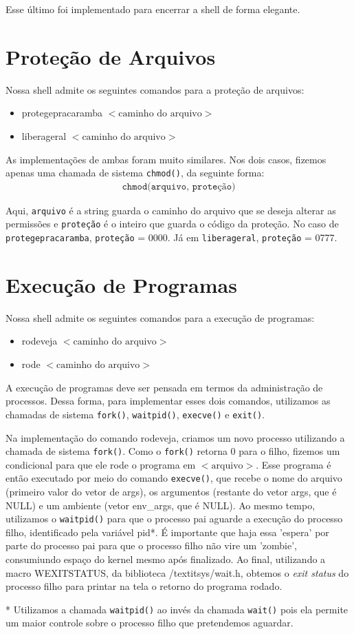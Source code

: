 \documentclass[a4paper, 12pt]{article}
\begin{document}
Esse último foi implementado para encerrar a shell de forma elegante.

\section{Proteção de Arquivos}

Nossa shell admite os seguintes comandos para a proteção de arquivos:
\begin{itemize}
\item protegepracaramba $<\textrm{caminho do arquivo}>$
\item liberageral $<\textrm{caminho do arquivo}>$
\end{itemize}

As implementações de ambas foram muito similares.  Nos dois casos,  fizemos apenas uma chamada de sistema \texttt{chmod()}, da seguinte forma:
\begin{align*}
\texttt{chmod(arquivo, proteção)}
\end{align*}


Aqui, \texttt{arquivo} é a string guarda o caminho do arquivo que se deseja alterar as permissões e \texttt{proteção} é o inteiro que guarda o código da proteção.  No caso de \texttt{protegepracaramba}, \texttt{proteção} = 0000. Já em \texttt{liberageral}, \texttt{proteção} = 0777.

\section{Execução de Programas}

Nossa shell admite os seguintes comandos para a execução de programas:
\begin{itemize}
\item rodeveja $<\textrm{caminho do arquivo}>$
\item rode $<\textrm{caminho do arquivo}>$
\end{itemize}

A execução de programas deve ser pensada em termos da administração de processos. Dessa forma, para implementar esses dois comandos, utilizamos as chamadas de sistema \texttt{fork()}, \texttt{waitpid()}, \texttt{execve()} e \texttt{exit()}.

Na implementação do comando rodeveja, criamos um novo processo utilizando a chamada de sistema \texttt{fork()}. Como o \texttt{fork()} retorna 0 para o filho, fizemos um condicional para que ele rode o programa em $<\textrm{arquivo}>$. Esse programa é então executado por meio do comando \texttt{execve()}, que recebe o nome do arquivo (primeiro valor do vetor de args), os argumentos (restante do vetor args, que é NULL) e um ambiente (vetor env_args, que é NULL). Ao mesmo tempo, utilizamos o \texttt{waitpid()} para que o processo pai aguarde a execução do processo filho, identificado pela variável pid*. É importante que haja essa 'espera' por parte do processo pai para que o processo filho não vire um 'zombie', consumiundo espaço do kernel mesmo após finalizado. Ao final, utilizando a macro WEXITSTATUS, da biblioteca /textit{sys/wait.h}, obtemos o \textit{exit status} do processo filho para printar na tela o retorno do programa rodado.

* Utilizamos a chamada \texttt{waitpid()} ao invés da chamada \texttt{wait()} pois ela permite um maior controle sobre o processo filho que pretendemos aguardar.
\end{document}
